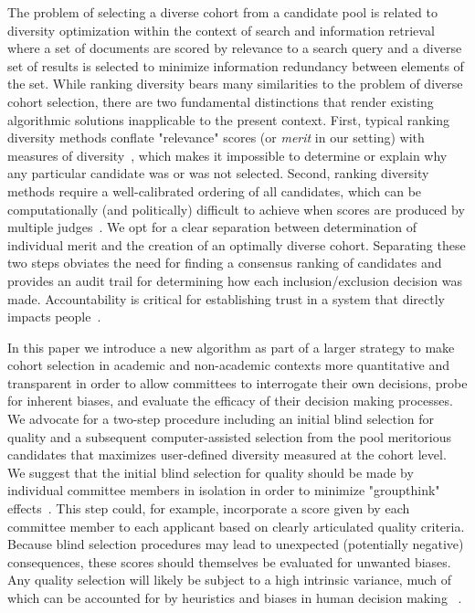 \documentclass[12pt]{article}
\newcommand{\BMN}[1]{\textcolor{blue}{BM:~#1}\normalcolor{}}
\begin{document}
The problem of selecting a diverse cohort from a candidate pool is related to diversity optimization within the context of search and information retrieval~\cite{carbonell1998use} where a set of documents are scored by relevance to a search query and a diverse set of results is selected to minimize information redundancy between elements of the set.
While ranking diversity bears many similarities to the problem of diverse cohort selection, there are two fundamental distinctions that render existing algorithmic solutions inapplicable to the present context.
First, typical ranking diversity methods conflate "relevance" scores (or \emph{merit} in our setting) with measures of diversity~\cite{clarke2008novelty}, which makes it impossible to determine or explain why any particular candidate was or was not selected.
Second, ranking diversity methods require a well-calibrated ordering of all candidates, which can be computationally (and politically) difficult to achieve when scores are produced by multiple judges~\cite{dwork2001rank}. %
We opt for a clear separation between determination of individual merit and the creation of an optimally diverse cohort. Separating these two steps obviates the need for finding a consensus ranking of candidates and provides an audit trail for determining how each inclusion/exclusion decision was made. Accountability is critical for establishing trust in a system that directly impacts people~\cite{fatml}.

In this paper we introduce a new algorithm as part of a larger strategy to make cohort selection in academic and non-academic contexts more quantitative and transparent in order to allow committees to interrogate their own decisions, probe for inherent biases, and evaluate the efficacy of their decision making processes.   
We advocate for a two-step procedure including an initial blind selection for quality and a subsequent computer-assisted selection from the pool meritorious candidates that maximizes user-defined diversity measured at the cohort level. We suggest that the initial blind selection for quality should be made by individual committee members in isolation in order to minimize "groupthink" effects~\cite{janis1982}.
This step could, for example, incorporate a score given by each committee member to each applicant based on clearly articulated quality criteria.
Because blind selection procedures may lead to unexpected (potentially negative) consequences, these scores should themselves be evaluated for unwanted biases.
Any quality selection will likely be subject to a high intrinsic variance, much of which can be accounted for by heuristics and biases in human decision making ~\cite{Greenwald1995, grove1996}.
\end{document}
